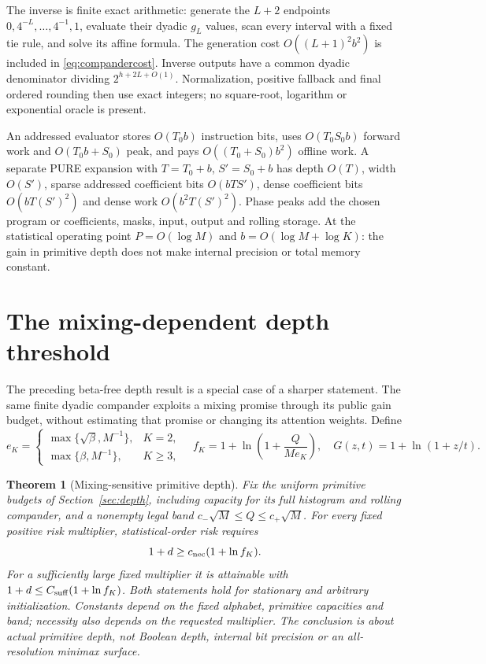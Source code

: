 \documentclass[11pt,letterpaper]{article}
\newtheorem{theorem}{Theorem}[section]
\theoremstyle{definition}\newtheorem{definition}[theorem]{Definition}
\theoremstyle{remark}\newtheorem{remark}[theorem]{Remark}
\begin{document}
The inverse is finite exact arithmetic: generate the $L+2$ endpoints $0,4^{-L},\ldots,4^{-1},1$, evaluate their dyadic $g_L$ values, scan every interval with a fixed tie rule, and solve its affine formula. The generation cost $O((L+1)^2b^2)$ is included in \eqref{eq:compandercost}. Inverse outputs have a common dyadic denominator dividing $2^{h+2L+O(1)}$. Normalization, positive fallback and final ordered rounding then use exact integers; no square-root, logarithm or exponential oracle is present.

An addressed evaluator stores $O(T_0b)$ instruction bits, uses
$O(T_0S_0b)$ forward work and $O(T_0b+S_0)$ peak, and pays
$O((T_0+S_0)b^2)$ offline work.
A separate PURE expansion with $T=T_0+b$, $S'=S_0+b$ has depth $O(T)$, width $O(S')$, sparse addressed coefficient bits $O(bTS')$, dense coefficient bits $O(bT(S')^2)$ and dense work $O(b^2T(S')^2)$. Phase peaks add the chosen program or coefficients, masks, input, output and rolling storage. At the statistical operating point $P=O(\log M)$ and $b=O(\log M+\log K)$: the gain in primitive depth does not make internal precision or total memory constant.

\section{The mixing-dependent depth threshold}\label{sec:mixdepth}
The preceding beta-free depth result is a special case of a sharper statement. The same finite dyadic compander exploits a mixing promise through its public gain budget, without estimating that promise or changing its attention weights. Define
\[
 e_K=\begin{cases}\max\{\sqrt\beta,M^{-1}\},&K=2,\\
 \max\{\beta,M^{-1}\},&K\ge3,\end{cases}\quad
 f_K=1+\ln\left(1+\frac{Q}{Me_K}\right),\quad
 G(z,t)=1+\ln(1+z/t).
\]
\begin{theorem}[Mixing-sensitive primitive depth]\label{thm:mixdepth}
Fix the uniform primitive budgets of Section~\ref{sec:depth}, including capacity for its full histogram and rolling compander, and a nonempty legal band $c_-\sqrt M\le Q\le c_+\sqrt M$. For every fixed positive risk multiplier, statistical-order risk requires
\[
 1+d\ge c_{\rm nec}(1+\ln f_K).
\]
For a sufficiently large fixed multiplier it is attainable with
$1+d\le C_{\rm suff}(1+\ln f_K)$. Both statements hold for stationary and arbitrary initialization. Constants depend on the fixed alphabet, primitive capacities and band; necessity also depends on the requested multiplier. The conclusion is about actual primitive depth, not Boolean depth, internal bit precision or an all-resolution minimax surface.
\end{theorem}
\end{document}
